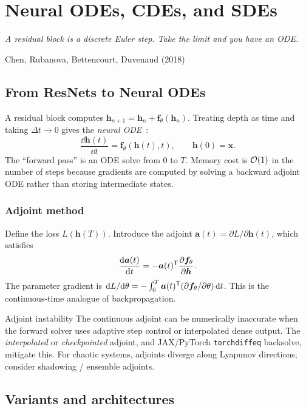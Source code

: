 \chapter{Neural ODEs, CDEs, and SDEs}
\label{ch:nodes}

\epigraph{\itshape A residual block is a discrete Euler step. Take the
limit and you have an ODE.}{Chen, Rubanova, Bettencourt, Duvenaud (2018)}

\section{From ResNets to Neural ODEs}
A residual block computes
$\bm{h}_{n+1}=\bm{h}_n+\bm{f}_\theta(\bm{h}_n)$. Treating depth as time
and taking $\Delta t\to 0$ gives the \emph{neural ODE}~\cite{chen2018neuralode}:
\begin{equation}
\frac{\dd \bm{h}(t)}{\dd t}=\bm{f}_\theta(\bm{h}(t),t),\qquad
\bm{h}(0)=\bm{x}.
\end{equation}
The ``forward pass'' is an ODE solve from $0$ to $T$. Memory cost is
$\mathcal{O}(1)$ in the number of steps because gradients are computed by
solving a backward adjoint ODE rather than storing intermediate states.

\subsection{Adjoint method}
Define the loss $L(\bm{h}(T))$. Introduce the adjoint
$\bm{a}(t)=\partial L/\partial \bm{h}(t)$, which satisfies
\begin{equation}
\frac{\mathrm{d} \bm{a}(t)}{\mathrm{d} t}=-\bm{a}(t)^{\mathsf{T}} \frac{\partial \bm{f}_\theta}{\partial \bm{h}}.
\end{equation}
The parameter gradient is
$\mathrm{d} L/\mathrm{d}\theta=-\int_0^T \bm{a}(t)^{\mathsf{T}} (\partial \bm{f}_\theta/\partial\theta)\,\mathrm{d} t$.
This is the continuous-time analogue of backpropagation.

\begin{pitfall}{Adjoint instability}
The continuous adjoint can be numerically inaccurate when the forward
solver uses adaptive step control or interpolated dense output. The
\emph{interpolated} or \emph{checkpointed} adjoint, and JAX/PyTorch
\texttt{torchdiffeq} backsolve, mitigate this. For chaotic systems,
adjoints diverge along Lyapunov directions; consider shadowing /
ensemble adjoints.
\end{pitfall}

\section{Variants and architectures}
